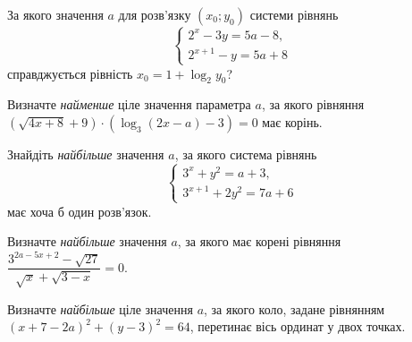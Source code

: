 \documentclass[12pt]{article}
\begin{document}
\begin{samepage}
\noindent\zadnum За якого значення $a$ для розв'язку $(x_0; y_0)$ системи рівнянь
$$
\begin{cases}
2^x - 3y = 5a - 8, \\
2^{x+1} - y = 5a + 8
\end{cases}
$$
справджується рівність $x_0 = 1 + \log_2 y_0$? 

\nmtnobreak
\nopagebreak\nbvspace{0.3cm}
\nmtAnswerBox
\par{}
\end{samepage}

\begin{samepage}
\noindent\zadnum Визначте \textit{найменше} ціле значення параметра $a$, за якого рівняння $(\sqrt{4x + 8} + 9) \cdot (\log_3(2x - a) - 3) = 0$ має корінь. 

\nmtnobreak
\nopagebreak\nbvspace{0.3cm}
\nmtAnswerBox
\par{}
\end{samepage}

\begin{samepage}
\noindent\zadnum Знайдіть \textit{найбільше} значення $a$, за якого система рівнянь
$$
\begin{cases}
3^x + y^2 = a + 3, \\
3^{x+1} + 2y^2 = 7a + 6
\end{cases}
$$
має хоча б один розв'язок. 

\nmtnobreak
\nopagebreak\nbvspace{0.3cm}
\nmtAnswerBox
\par{}
\end{samepage}

\begin{samepage}
\noindent\zadnum Визначте \textit{найбільше} значення $a$, за якого має корені рівняння $\dfrac{3^{2a-5x+2} - \sqrt{27}}{\sqrt{x} + \sqrt{3-x}} = 0$. 

\nmtnobreak
\nopagebreak\nbvspace{0.3cm}
\nmtAnswerBox
\par{}
\end{samepage}

\begin{samepage}
\noindent\zadnum Визначте \textit{найбільше} ціле значення $a$, за якого коло, задане рівнянням $(x + 7 - 2a)^2 + (y - 3)^2 = 64$, перетинає вісь ординат у двох точках. 

\nmtnobreak
\nopagebreak\nbvspace{0.3cm}
\nmtAnswerBox
\par{}
\end{samepage}
\end{document}

